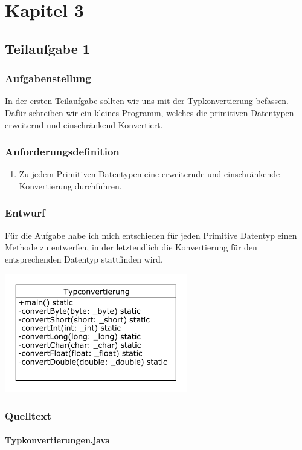 \section{Kapitel 3}
\subsection{Teilaufgabe 1}
\subsubsection{Aufgabenstellung}
In der ersten Teilaufgabe sollten wir uns mit der Typkonvertierung befassen. Dafür schreiben wir
ein kleines Programm, welches die primitiven Datentypen erweiternd und einschränkend
Konvertiert.

\subsubsection{Anforderungsdefinition}
\begin{enumerate}
	\item Zu jedem Primitiven Datentypen eine erweiternde und einschränkende Konvertierung
	durchführen.
\end{enumerate}

\subsubsection{Entwurf}
Für die Aufgabe habe ich mich entschieden für jeden Primitive Datentyp einen Methode zu entwerfen, in
der letztendlich die Konvertierung für den entsprechenden Datentyp stattfinden wird.
\begin{center}
	\includegraphics[width=0.6\textwidth]{uml/uml_c3_p1.pdf}
\end{center}

\subsubsection{Quelltext}
\paragraph{Typkonvertierungen.java}\



